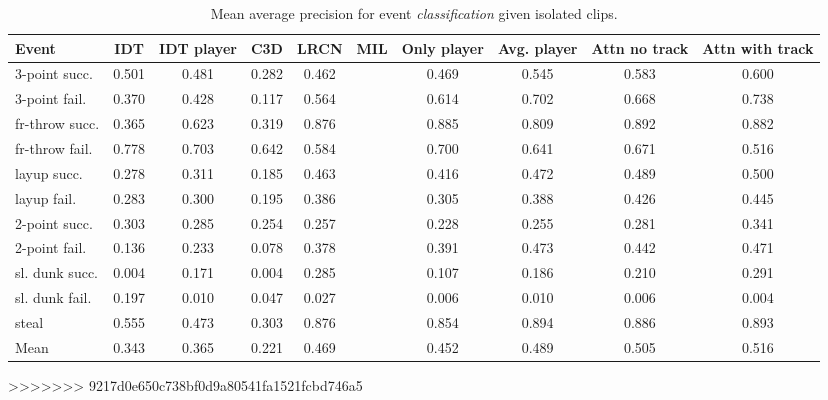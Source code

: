 \begin{table}[t!]
\begin{center}
\small
 \begin{tabular}{|l|c|c|c|c|c|c|c|c|c|}
  \hline
Event & IDT& IDT player & C3D
 & LRCN  & MIL & Only
player & Avg. player & Attn no track & Attn with track \\ \hline \hline

3-point succ.    & 0.501 & 0.481 & 0.282 & 0.462 &  & 0.469 & 0.545 & 0.583 & 0.600 \\
3-point fail.    & 0.370 &  0.428& 0.117 & 0.564 &  & 0.614 & 0.702 & 0.668 & 0.738 \\
fr-throw succ. & 0.365 &  0.623& 0.319 & 0.876 &  & 0.885 & 0.809 & 0.892 & 0.882 \\
fr-throw fail. & 0.778 &  0.703& 0.642 & 0.584 &  & 0.700 & 0.641 & 0.671 & 0.516 \\
layup succ.      & 0.278 & 0.311 & 0.185 & 0.463 &  & 0.416 & 0.472 & 0.489 & 0.500 \\
layup fail.      & 0.283 &0.300  & 0.195 & 0.386 &  & 0.305 & 0.388 & 0.426 & 0.445 \\
2-point succ.    & 0.303 &  0.285 & 0.254 & 0.257 &  & 0.228 & 0.255 & 0.281 & 0.341 \\
2-point fail.    & 0.136 &  0.233 & 0.078 & 0.378 &  & 0.391 & 0.473 & 0.442 & 0.471 \\
sl. dunk succ.  & 0.004 &  0.171 & 0.004 & 0.285 &  & 0.107 & 0.186 & 0.210 & 0.291 \\
sl. dunk fail.  & 0.197 &  0.010& 0.047 & 0.027 &  & 0.006 & 0.010 & 0.006 & 0.004 \\
steal            & 0.555 &  0.473& 0.303 & 0.876 &  & 0.854 & 0.894 & 0.886 & 0.893 \\ \hline \hline
Mean             & 0.343 &  0.365 & 0.221 & 0.469 &  & 0.452 & 0.489 & 0.505 & 0.516 \\ \hline
  \end{tabular}
\end{center}
  \caption{Mean average precision for event {\em classification} given
    isolated clips.}
  \label{tab:event_class}
  \label{tab:class_res}
\end{table}
>>>>>>> 9217d0e650c738bf0d9a80541fa1521fcbd746a5

